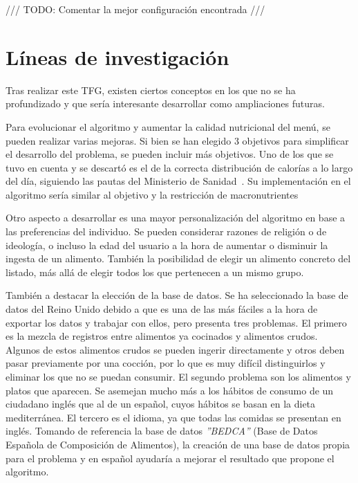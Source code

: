 \begin{center}
    {\color{red} \Large /// TODO: Comentar la mejor configuración encontrada ///}
\end{center}


\section{Líneas de investigación}
\label{ch:investigacion}

Tras realizar este TFG, existen ciertos conceptos en los que no se ha profundizado y que sería interesante desarrollar como ampliaciones futuras.

Para evolucionar el algoritmo y aumentar la calidad nutricional del menú, se pueden realizar varias mejoras. Si bien se han elegido 3 objetivos para simplificar el desarrollo del problema, se pueden incluir más objetivos. Uno de los que se tuvo en cuenta y se descartó es el de la correcta distribución de calorías a lo largo del día, siguiendo las pautas del Ministerio de Sanidad~\cite{alimentacion_saludable}. Su implementación en el algoritmo sería similar al objetivo y la restricción de macronutrientes

Otro aspecto a desarrollar es una mayor personalización del algoritmo en base a las preferencias del individuo. Se pueden considerar razones de religión o de ideología, o incluso la edad del usuario a la hora de aumentar o disminuir la ingesta de un alimento. También la posibilidad de elegir un alimento concreto del listado, más allá de elegir todos los que pertenecen a un mismo grupo.

También a destacar la elección de la base de datos. Se ha seleccionado la base de datos del Reino Unido debido a que es una de las más fáciles a la hora de exportar los datos y trabajar con ellos, pero presenta tres problemas. El primero es la mezcla de registros entre alimentos ya cocinados y alimentos crudos. Algunos de estos alimentos crudos se pueden ingerir directamente y otros deben pasar previamente por una cocción, por lo que es muy difícil distinguirlos y eliminar los que no se puedan consumir. El segundo problema son los alimentos y platos que aparecen. Se asemejan mucho más a los hábitos de consumo de un ciudadano inglés que al de un español, cuyos hábitos se basan en la dieta mediterránea. El tercero es el idioma, ya que todas las comidas se presentan en inglés. Tomando de referencia la base de datos \textit{''BEDCA''} (Base de Datos Española de Composición de Alimentos), la creación de una base de datos propia para el problema y en español ayudaría a mejorar el resultado que propone el algoritmo.
\newpage

